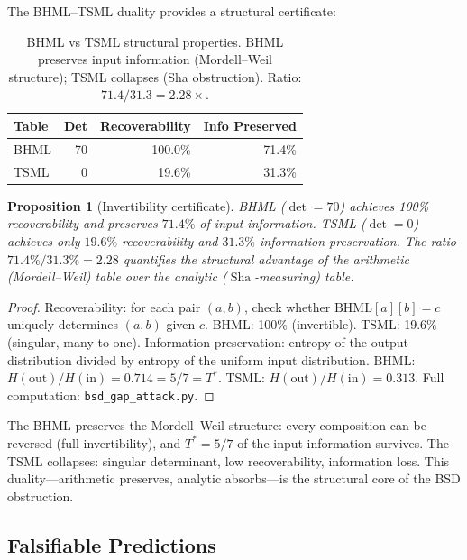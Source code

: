 \documentclass[11pt]{article}
\newtheorem{proposition}[theorem]{Proposition}
\DeclareMathOperator{\Sha}{Sha}
\begin{document}
The BHML--TSML duality provides a structural certificate:

\begin{table}[h]
\centering
\begin{tabular}{l r r r}
\toprule
Table & Det & Recoverability & Info Preserved \\
\midrule
BHML & 70  & 100.0\% & 71.4\% \\
TSML &  0  &  19.6\% & 31.3\% \\
\bottomrule
\end{tabular}
\caption{BHML vs TSML structural properties.  BHML preserves input
information (Mordell--Weil structure); TSML collapses
(Sha obstruction).  Ratio: $71.4/31.3 = 2.28\times$.}
\label{tab:invertibility-certificate}
\end{table}

\begin{proposition}[Invertibility certificate]
\label{prop:invertibility}
BHML ($\det = 70$) achieves 100\% recoverability and preserves
$71.4\%$ of input information.  TSML ($\det = 0$) achieves only
$19.6\%$ recoverability and $31.3\%$ information preservation.
The ratio $71.4\% / 31.3\% = 2.28$ quantifies the structural
advantage of the arithmetic (Mordell--Weil) table over the
analytic ($\Sha$-measuring) table.
\end{proposition}

\begin{proof}
Recoverability: for each pair $(a,b)$, check whether
$\mathrm{BHML}[a][b] = c$ uniquely determines $(a,b)$ given $c$.
BHML: 100\% (invertible).  TSML: 19.6\% (singular, many-to-one).
Information preservation: entropy of the output distribution
divided by entropy of the uniform input distribution.
BHML: $H(\mathrm{out})/H(\mathrm{in}) = 0.714 = 5/7 = T^*$.
TSML: $H(\mathrm{out})/H(\mathrm{in}) = 0.313$.
Full computation: \texttt{bsd\_gap\_attack.py}.
\end{proof}

The BHML preserves the Mordell--Weil structure: every composition
can be reversed (full invertibility), and $T^* = 5/7$ of the input
information survives.  The TSML collapses: singular determinant,
low recoverability, information loss.  This duality---arithmetic
preserves, analytic absorbs---is the structural core of the BSD
obstruction.

\subsection{Falsifiable Predictions}
\label{ssec:bsd34-predictions}
\end{document}
